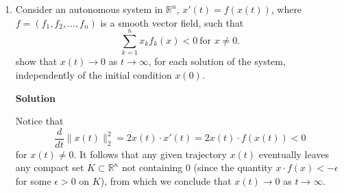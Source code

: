 \documentclass{article}
\begin{document}
\begin{enumerate}
\item Consider an autonomous system in \(\mathbb{R}^n\), \(x'(t) = f(x(t))\), where \(f = (f_1, f_2, \ldots, f_n)\) is a smooth vector field, such that
\[\sum_{k = 1}^n x_k f_k(x) < 0 \ \text{for \(x \neq 0\)}.\]
show that \(x(t) \to 0\) as \(t \to \infty\), for each solution of the system, independently of the initial condition \(x(0)\).

{\bf Solution}

Notice that
\[\frac{d}{dt} \|x(t)\|_2^2 = 2 x(t) \cdot x'(t) = 2 x(t) \cdot f(x(t)) < 0\]
for \(x(t) \neq 0\).  It follows that any given trajectory \(x(t)\) eventually leaves any compact set \(K \subset \mathbb{R}^n\) not containing \(0\) (since the quantity \(x \cdot f(x) < -\epsilon\) for some \(\epsilon > 0\) on \(K\)), from which we conclude that \(x(t) \to 0\) as \(t \to \infty\).



\end{enumerate}
\end{document}
